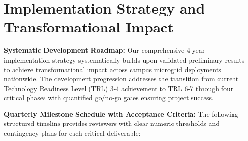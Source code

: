 \documentclass[12pt]{article}
\begin{document}
\section{Implementation Strategy and Transformational Impact}

\textbf{Systematic Development Roadmap:} Our comprehensive 4-year implementation strategy systematically builds upon validated preliminary results to achieve transformational impact across campus microgrid deployments nationwide. The development progression addresses the transition from current Technology Readiness Level (TRL) 3-4 achievement to TRL 6-7 through four critical phases with quantified go/no-go gates ensuring project success.

\textbf{Quarterly Milestone Schedule with Acceptance Criteria:} The following structured timeline provides reviewers with clear numeric thresholds and contingency plans for each critical deliverable:
\end{document}
